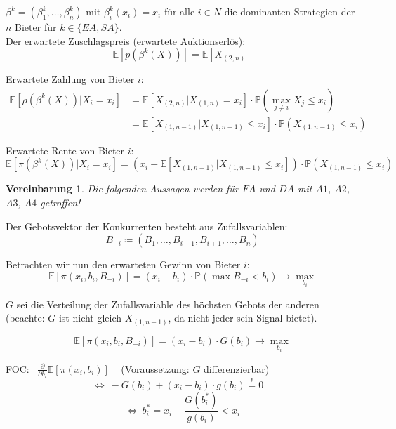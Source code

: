 \documentclass[12pt]{extreport} %
\theoremstyle{named}
\theoremstyle{nnamed}
\theoremstyle{itshape}
\theoremstyle{normal}
\newtheorem*{vereinbarung}{Vereinbarung}
\begin{document}
$\beta^{k} = \left(\beta_{1}^{k}, \dotsc, \beta_{n}^{k} \right)$ mit $\beta_{i}^{k}(x_{i}) = x_{i}$ für alle $i \in N$ die dominanten Strategien der $n$ Bieter für $k \in \{ EA, SA \}$. \\

Der erwartete Zuschlagspreis (erwartete Auktionserlös):
	$$ \mathbb{E}\left[ p\left(\beta^{k}(X) \right) \right] = \mathbb{E}[X_{(2,n)}] $$
	
Erwartete Zahlung von Bieter $i$:
	\begin{align*}
		\mathbb{E}\left[ \rho\left( \beta^{k}(X) \right) \big| X_{i} = x_{i} \right] & = \mathbb{E}\left[ X_{(2,n)} \big| X_{(1, n)} = x_{i} \right] \cdot \mathbb{P}\left( \max_{j\neq i} X_{j} \leq x_{i} \right) \\
			& = \mathbb{E}\left[ X_{(1,n-1)} \big| X_{(1, n-1)} \leq x_{i} \right] \cdot \mathbb{P}\left( X_{(1, n-1)} \leq x_{i} \right)
	\end{align*}
	
Erwartete Rente von Bieter $i$:
$$ \mathbb{E}\left[ \pi\left( \beta^{k}(X) \right) \big| X_{i} = x_{i} \right] = \left( x_{i} - \mathbb{E} \left[ X_{(1, n-1)} \big| X_{(1, n-1)} \leq x_{i} \right] \right) \cdot \mathbb{P}\left( X_{(1,n-1)} \leq x_{i} \right) $$

\begin{vereinbarung}
	Die folgenden Aussagen werden für $FA$ und $DA$ mit $A1$, $A2$, $A3$, $A4$ getroffen!
\end{vereinbarung}

Der Gebotsvektor der Konkurrenten besteht aus Zufallsvariablen:
	$$ B_{-i} \coloneqq \left(B_{1}, \dotsc, B_{i-1}, B_{i+1}, \dotsc, B_{n} \right) $$

Betrachten wir nun den erwarteten Gewinn von Bieter $i$:
$$ \mathbb{E}[\pi\left( x_{i}, b_{i}, B_{-i} \right)] = (x_{i} - b_{i}) \cdot \mathbb{P}\left( \max B_{-i} < b_{i} \right) \longrightarrow \max_{b_{i}} $$

$G$ sei die Verteilung der Zufallsvariable des höchsten Gebots der anderen (beachte: $G$ ist nicht gleich $X_{(1, n-1)}$, da nicht jeder sein Signal bietet).

$$ \mathbb{E}[\pi\left( x_{i}, b_{i}, B_{-i} \right)] = (x_{i} - b_{i}) \cdot G(b_{i}) \longrightarrow \max_{b_{i}} $$

FOC: ~$\frac{\partial}{\partial b_{i}} \mathbb{E}\left[ \pi(x_{i}, b_{i} ) \right]$ ~ (Voraussetzung: $G$ differenzierbar)
$$ \iff ~ - G(b_{i}) + (x_{i} - b_{i}) \cdot g(b_{i}) \overset{!}{=} 0 \quad $$
$$ \iff ~ b_{i}^{*} = x_{i} - \frac{G(b_{i}^{*})}{g(b_{i})} < x_{i} $$
\end{document}
